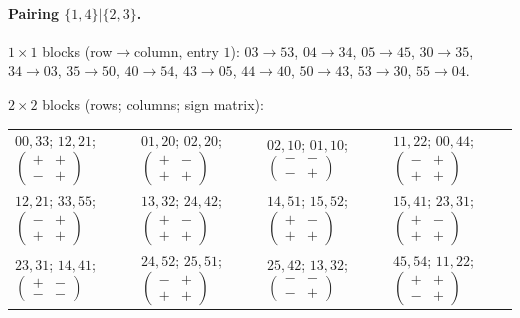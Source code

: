 \paragraph{Pairing $\{1,4\}|\{2,3\}$.}
$1\times1$ blocks (row$\to$column, entry $1$): $03\to53$, $04\to34$, $05\to45$, $30\to35$, $34\to03$, $35\to50$, $40\to54$, $43\to05$, $44\to40$, $50\to43$, $53\to30$, $55\to04$.

$2\times2$ blocks (rows; columns; sign matrix):
\begin{center}\small\begin{tabular}{llll}
$00,33$; $12,21$; $\left(\begin{smallmatrix}+&+\\-&+\end{smallmatrix}\right)$ & $01,20$; $02,20$; $\left(\begin{smallmatrix}+&-\\+&+\end{smallmatrix}\right)$ & $02,10$; $01,10$; $\left(\begin{smallmatrix}-&-\\-&+\end{smallmatrix}\right)$ & $11,22$; $00,44$; $\left(\begin{smallmatrix}-&+\\+&+\end{smallmatrix}\right)$ \\
$12,21$; $33,55$; $\left(\begin{smallmatrix}-&+\\+&+\end{smallmatrix}\right)$ & $13,32$; $24,42$; $\left(\begin{smallmatrix}+&-\\+&+\end{smallmatrix}\right)$ & $14,51$; $15,52$; $\left(\begin{smallmatrix}+&-\\+&+\end{smallmatrix}\right)$ & $15,41$; $23,31$; $\left(\begin{smallmatrix}+&-\\+&+\end{smallmatrix}\right)$ \\
$23,31$; $14,41$; $\left(\begin{smallmatrix}+&-\\-&-\end{smallmatrix}\right)$ & $24,52$; $25,51$; $\left(\begin{smallmatrix}-&+\\+&+\end{smallmatrix}\right)$ & $25,42$; $13,32$; $\left(\begin{smallmatrix}-&-\\-&+\end{smallmatrix}\right)$ & $45,54$; $11,22$; $\left(\begin{smallmatrix}+&+\\-&+\end{smallmatrix}\right)$ \\
\end{tabular}\end{center}
